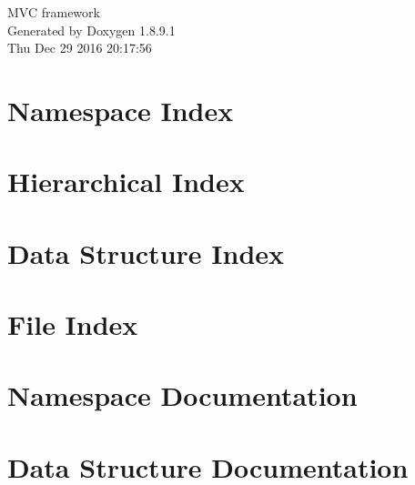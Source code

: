 \documentclass[twoside]{book}
\newcommand{\+}{\discretionary{\mbox{\scriptsize$\hookleftarrow$}}{}{}}
\newcommand{\clearemptydoublepage}{%
  \newpage{\pagestyle{empty}\cleardoublepage}%
}
\begin{document}
\hypersetup{pageanchor=false,
             bookmarks=true,
             bookmarksnumbered=true,
             pdfencoding=unicode
            }
\begin{titlepage}
\vspace*{7cm}
\begin{center}%
{\Large M\+V\+C framework }\\
\vspace*{1cm}
{\large Generated by Doxygen 1.8.9.1}\\
\vspace*{0.5cm}
{\small Thu Dec 29 2016 20:17:56}\\
\end{center}
\end{titlepage}
\clearemptydoublepage
\tableofcontents
\clearemptydoublepage
{}
\hypersetup{pageanchor=true}

\chapter{Namespace Index}

\chapter{Hierarchical Index}

\chapter{Data Structure Index}

\chapter{File Index}

\chapter{Namespace Documentation}

\chapter{Data Structure Documentation}























\end{document}
